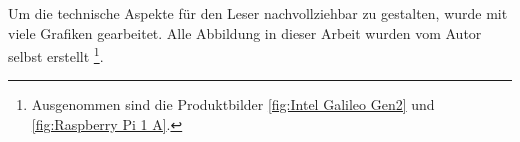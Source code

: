 \par
Um die technische Aspekte für den Leser nachvollziehbar zu gestalten, wurde mit viele Grafiken gearbeitet. Alle Abbildung in dieser Arbeit wurden vom Autor selbst erstellt \footnote{Ausgenommen sind die Produktbilder \autoref{fig:Intel Galileo Gen2} und \ref{fig:Raspberry Pi 1 A}.}. 












\begin{comment}

In der heutigen Zeit ist die nachhaltige Produktion von Energie und ein schonender Umgang mit dieser Ressource ein wichtiges Anliegen der Öffentlichkeit. Speziell die IT-Branche ist von einem grossen Wachstum geprägt. Immer mehr Tätigkeiten werden automatisiert und bestehende Systeme ausgebaut. Dies verursacht einen immer grösseren Stromverbrauch im IT-Bereich. Ein Ziel der Energiepolitik 2050 ist die Senkung des immer weiter steigenden Energieverbrauchs.
\par
Um in der IT-Branche Energie zu sparen, können verschiedene Ansätze gewählt werden. Beispielsweise besteht die Möglichkeit bei Inaktivität automatisch in den Ruhemodus zu wechseln oder die Prozessoren durch sogenannte Sparmodi, insbesondere dynamische Taktfrequenzen oder das kurzzeitige Ein- und Ausschalten der Rechnereinheit, zu optimieren. Diese Sparansätze zielen jeweils nur auf den Hard- oder Softwarebereich ab. Sie berücksichtigen jedoch nicht die besondere Funktionsweise eines jeden Computers, wo die Software die Hardware, also ein Programm einen Prozessor, ansteuert. Anders im Rahmen dieser Arbeit, in welcher das Sparpotenzial bereichsübergreifend erforscht wird.



\section{Übersicht}


\end{comment}
